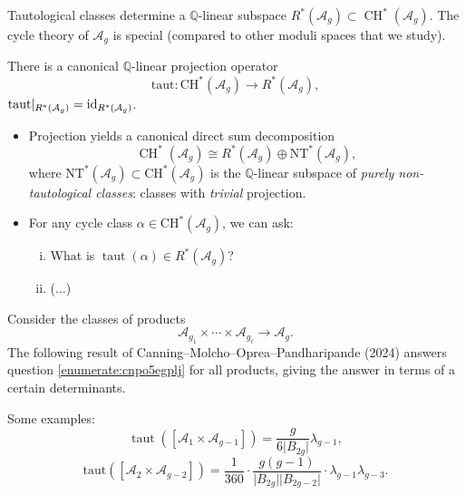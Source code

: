 \documentclass[reqno]{amsart} 
\begin{document}
Tautological classes determine a $\mathbb{Q}$-linear subspace $R^\ast(\mathcal{A}_g) \subset \operatorname{CH}^\ast(\mathcal{A}_g)$.  The cycle theory of $\mathcal{A}_g$ is special (compared to other moduli spaces that we study).
\begin{theorem}
  There is a canonical $\mathbb{Q}$-linear projection operator
  \begin{equation*}
    \mathrm{taut} : \mathrm{CH}^\ast(\mathcal{A}_g) \rightarrow R^\ast(\mathcal{A}_g),
  \end{equation*}
  $\mathrm{taut} |_{R^\ast(\mathcal{A}_g)} = \operatorname{id}_{R^\ast(\mathcal{A}_g)}$.
\end{theorem}
\begin{itemize}
\item Projection yields a canonical direct sum decomposition
  \begin{equation*}
    \operatorname{CH}^\ast(\mathcal{A}_g) \cong R^\ast(\mathcal{A}_g)
    \oplus \mathrm{NT}^\ast(\mathcal{A}_g),
  \end{equation*}
  where $\mathrm{NT}^\ast(\mathcal{A}_g) \subset \mathrm{CH}^\ast(\mathcal{A}_g)$ is the $\mathbb{Q}$-linear subspace of \emph{purely non-tautological classes}: classes with \emph{trivial} projection.
\item For any cycle class $\alpha \in \mathrm{CH}^\ast(\mathcal{A}_g)$, we can ask:
  \begin{enumerate}[(i)]
  \item\label{enumerate:cnpo5egplj} What is $\operatorname{taut}(\alpha) \in R^\ast(\mathcal{A}_g)$?
  \item (...)
  \end{enumerate}
\end{itemize}
Consider the classes of products
\begin{equation*}
  \mathcal{A}_{g_1} \times \dotsb \times \mathcal{A}_{g_{\ell}} \rightarrow \mathcal{A}_g.
\end{equation*}
The following result of Canning--Molcho--Oprea--Pandharipande (2024) answers question \eqref{enumerate:cnpo5egplj} for all products, giving the answer in terms of a certain determinants.

Some examples:
\begin{equation*}
  \operatorname{taut}([\mathcal{A}_1 \times \mathcal{A}_{g - 1}])
  = \frac{g}{6 \lvert B_{2 g} \rvert} \lambda_{g - 1},
\end{equation*}
\begin{equation*}
  \mathrm{taut}([\mathcal{A}_2 \times \mathcal{A}_{g - 2}]
  )
  = \frac{1}{360} \cdot \frac{g(g - 1)}{\lvert B_{2 g} \rvert \lvert B_{2 g - 2} \rvert}
  \cdot \lambda_{g - 1} \lambda_{g - 3}.
\end{equation*}
\end{document}
